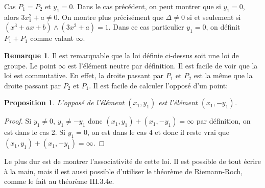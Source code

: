 \documentclass{article}
\theoremstyle{plain}%
\newtheorem{prop}[thm]{Proposition}
\theoremstyle{definition}%
\newtheorem{rem}[thm]{Remarque}
\begin{document}
\begin{center}
\end{center}
{\color{blue} Cas $P_1=P_2$ et $y_1=0$.} Dans le cas précédent, on peut montrer que si $y_1 = 0$, alors $3x_1^2 + a \neq 0$. 
On montre plus précisément que $\Delta \neq 0$ si et seulement si $(x^3 + ax + b)\wedge(3x^2 + a) = 1$. 
Dans ce cas particulier $y_1=0$, on définit $P_1+P_1$ comme valant $\infty$.

\begin{rem}
Il est remarquable que la loi définie ci-dessus soit une loi de groupe. Le point $\infty$ est l'élément neutre par définition. Il est facile de voir que la loi est commutative. En effet, la droite passant par $P_1$ et $P_2$ est la même que la droite passant par $P_2$ et $P_1$. Il est facile de calculer l'opposé d'un point:
\end{rem}

\begin{prop}
  \label{opposé}
L'opposé de l'élément $(x_1, y_1)$ est l'élément $(x_1, -y_1)$.
\end{prop}

\begin{proof}
  Si $y_1\neq 0$, $y_1\neq-y_1$ donc $(x_1, y_1) + (x_1, -y_1) = \infty$ par définition, on est dans le cas 2. Si $y_1 = 0$, on est dans le cas $4$ et donc il reste vrai que $(x_1, y_1) + (x_1, -y_1) = \infty$.
\end{proof}

Le plus dur est de montrer l'associativité de cette loi. Il est possible de tout écrire à la main, mais il est aussi possible d'utiliser le théorème de Riemann-Roch, comme le fait \cite{Silverman} au théorème III.3.4e.
\end{document}
